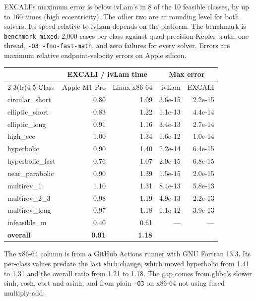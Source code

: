 \documentclass[11pt]{article}
\newcommand{\code}[1]{\texttt{#1}}
\begin{document}
EXCALI's maximum error is below ivLam's in 8 of the 10 feasible classes, by up to 160 times (high eccentricity). The other two are at rounding level for both solvers. Its speed relative to ivLam depends on the platform. The benchmark is \code{benchmark\_mixed}: 2,000 cases per class against quad-precision Kepler truth, one thread, \code{-O3 -fno-fast-math}, and zero failures for every solver. Errors are maximum relative endpoint-velocity errors on Apple silicon.

\begin{center}
\small
\begin{tabular}{l r r r r}
\toprule
& \multicolumn{2}{c}{EXCALI / ivLam time} & \multicolumn{2}{c}{Max error} \\
\cmidrule(lr){2-3}\cmidrule(lr){4-5}
Class & Apple M1 Pro & Linux x86-64 & ivLam & EXCALI \\
\midrule
circular\_short  & 0.80 & 1.09 & 3.6e-15 & 2.2e-15 \\
elliptic\_short  & 0.83 & 1.22 & 1.1e-13 & 4.4e-14 \\
elliptic\_long   & 0.91 & 1.16 & 3.4e-13 & 2.7e-14 \\
high\_ecc        & 1.00 & 1.34 & 1.6e-12 & 1.0e-14 \\
hyperbolic       & 0.90 & 1.40 & 2.2e-14 & 6.4e-15 \\
hyperbolic\_fast & 0.76 & 1.07 & 2.9e-15 & 6.8e-15 \\
near\_parabolic  & 0.90 & 1.39 & 1.5e-15 & 2.0e-15 \\
multirev\_1      & 1.10 & 1.31 & 8.4e-13 & 5.8e-13 \\
multirev\_2\_3   & 0.98 & 1.19 & 4.9e-13 & 2.2e-13 \\
multirev\_long   & 0.97 & 1.18 & 1.1e-12 & 3.9e-13 \\
infeasible\_m    & 0.40 & 0.61 & --- & --- \\
\midrule
\textbf{overall} & \textbf{0.91} & \textbf{1.18} & & \\
\bottomrule
\end{tabular}
\end{center}

The x86-64 column is from a GitHub Actions runner with GNU Fortran 13.3. Its per-class values predate the last \code{shch} change, which moved hyperbolic from 1.41 to 1.31 and the overall ratio from 1.21 to 1.18. The gap comes from glibc's slower sinh, cosh, cbrt and asinh, and from plain \code{-O3} on x86-64 not using fused multiply-add.
\end{document}
